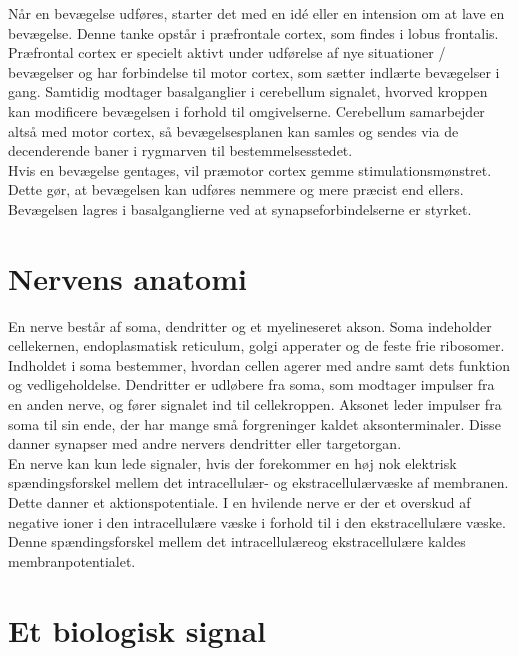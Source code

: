 Når en bevægelse udføres, starter det med en idé eller en intension om at lave en bevægelse. Denne tanke opstår i præfrontale cortex, som findes i lobus frontalis. Præfrontal cortex er specielt aktivt under udførelse af nye situationer / bevægelser og har forbindelse til motor cortex, som sætter indlærte bevægelser i gang. Samtidig modtager basalganglier i cerebellum signalet, hvorved kroppen kan modificere bevægelsen i forhold til omgivelserne. Cerebellum samarbejder altså med motor cortex, så bevægelsesplanen kan samles og sendes via de decenderende baner i rygmarven til bestemmelsesstedet. \cite{Bojsen-Moeller2012} \\
Hvis en bevægelse gentages, vil præmotor cortex gemme stimulationsmønstret. Dette gør, at bevægelsen kan udføres nemmere og mere præcist end ellers. Bevægelsen lagres i basalganglierne ved at synapseforbindelserne er styrket. \cite{Martini2012}

\section{Nervens anatomi}
En nerve består af soma, dendritter og et myelineseret akson. Soma indeholder cellekernen, endoplasmatisk reticulum, golgi apperater og de feste frie ribosomer. Indholdet i soma bestemmer, hvordan cellen agerer med andre samt dets funktion og vedligeholdelse. Dendritter er udløbere fra soma, som modtager impulser fra en anden nerve, og fører signalet ind til cellekroppen. Aksonet leder impulser fra soma til sin ende, der har mange små forgreninger kaldet aksonterminaler. Disse danner synapser med andre nervers dendritter eller targetorgan. \cite{Stanfield2014} \\
En nerve kan kun lede signaler, hvis der forekommer en høj nok elektrisk spændingsforskel mellem det intracellulær- og ekstracellulærvæske af membranen. Dette danner et aktionspotentiale. I en hvilende nerve er der et overskud af negative ioner i den intracellulære væske i forhold til i den ekstracellulære væske. Denne spændingsforskel mellem det intracellulæreog ekstracellulære kaldes membranpotentialet. \cite{Martini2012,Stanfield2014}

\section{Et biologisk signal}
